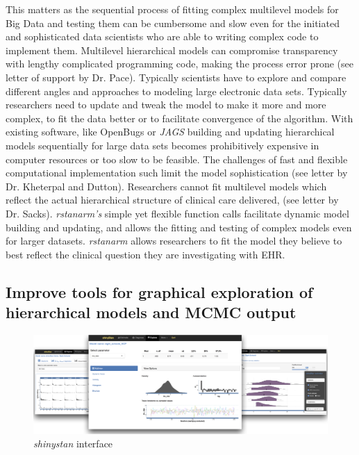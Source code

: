\documentclass[11pt,notitlepage]{article}
\begin{document}
This matters as the sequential process of fitting complex multilevel models for Big Data  and testing them can be cumbersome and slow even for the initiated and sophisticated data scientists who are able to writing complex code to implement them. Multilevel hierarchical models can compromise transparency with lengthy complicated programming code, making the process error prone (see letter of support by Dr. Pace). Typically scientists have to explore and compare different angles and approaches to modeling large electronic data sets. Typically researchers need to update and tweak the model to make it more and more complex, to fit the data better or to facilitate convergence of the algorithm. With existing software, like OpenBugs or \textit{JAGS} building and updating hierarchical models sequentially for large data sets becomes prohibitively expensive in computer resources or too slow to be feasible. The challenges of fast and flexible computational implementation such limit the model sophistication (see letter by Dr. Kheterpal and Dutton). Researchers cannot fit multilevel models which reflect the actual hierarchical structure of clinical care delivered, (see letter by Dr. Sacks). \textit{rstanarm's} simple yet flexible function calls facilitate dynamic model building and updating, and allows the fitting and testing of complex models even for larger datasets. \textit{rstanarm} allows researchers to fit the model they believe to best reflect the clinical question they are investigating with EHR.

\subsection*{Improve tools for graphical exploration of hierarchical models and MCMC output}

\begin{figure}
  \vspace{-10pt}
 \includegraphics[scale=1.2]{Figures/shinystan.png}
  \vspace{-10pt}
  \caption{\textit{shinystan} interface}
    \label{fig:shinystan}
 \vspace{- 10pt}
\end{figure}
\end{document}

